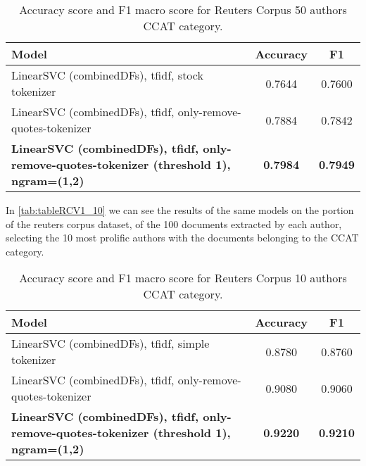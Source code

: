 \begin{table}[h!]
	\begin{center}  
		\caption[Reuters Corpus Results - 50 authors]{Accuracy score and F1 macro score for Reuters Corpus 50 authors CCAT category.} 
		\label{tab:tableRCV1_50}
		\begin{tabular}{| p{5 cm} | c | c |}
			\hline 
			Model & Accuracy & F1\\
			\hline
			LinearSVC (combinedDFs), tfidf, stock tokenizer & 0.7644 & 0.7600 \\ \hline
			LinearSVC (combinedDFs), tfidf, only-remove-quotes-tokenizer & 0.7884 & 0.7842 \\ \hline
			\textbf{LinearSVC (combinedDFs), tfidf, only-remove-quotes-tokenizer (threshold 1),
			ngram=(1,2)} & \textbf{0.7984} & \textbf{0.7949} \\ \hline
		\end{tabular} 
	\end{center}
\end{table}

In \autoref{tab:tableRCV1_10} we can see the results of the same models on the portion of the reuters corpus dataset, of the 100 documents extracted by each author, selecting the 10 most prolific authors with the documents belonging to the CCAT category.\\

\begin{table}[h!]
	\begin{center}  
		\caption[Reuters Corpus Results - 10 authors]{Accuracy score and F1 macro score for Reuters Corpus 10 authors CCAT category.} 
		\label{tab:tableRCV1_10}
		\begin{tabular}{| p{5 cm} | c | c |}
			\hline 
			Model & Accuracy & F1 \\
			\hline
			LinearSVC (combinedDFs), tfidf, simple tokenizer & 0.8780 & 0.8760 \\ \hline
			LinearSVC (combinedDFs), tfidf, only-remove-quotes-tokenizer & 0.9080 & 0.9060 \\ \hline
			\textbf{LinearSVC (combinedDFs), tfidf, only-remove-quotes-tokenizer (threshold 1),
			ngram=(1,2)} & \textbf{0.9220} & \textbf{0.9210} \\ \hline
		\end{tabular} 
	\end{center}
\end{table}

